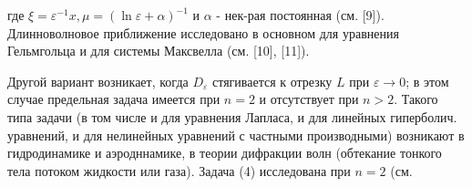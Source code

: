 \documentclass[10pt]{article}
\begin{document}
где $\xi=\varepsilon^{-1} x, \mu=(\ln \varepsilon+\alpha)^{-1}$ и $\alpha$ - нек-рая постоянная (см. [9]). Длинноволновое приближение исследовано в основном для уравнения Гельмгольца и для системы Максвелла (см. [10], [11]).



Другой вариант возникает, когда $D_{\varepsilon}$ стягивается к отрезку $L$ при $\varepsilon \rightarrow 0$; в этом случае предельная задача имеется при $n=2$ и отсутствует при $n>2$. Такого типа задачи (в том числе и для уравнения Лапласа, и для линейных гиперболич. уравнений, и для нелинейных уравнений с частными производными) возникают в гидродинамике и аэродннамике, в теории дифракции волн (обтекание тонкого тела потоком жидкости или газа). Задача (4) исследована при $n=2$ (см.
\end{document}
